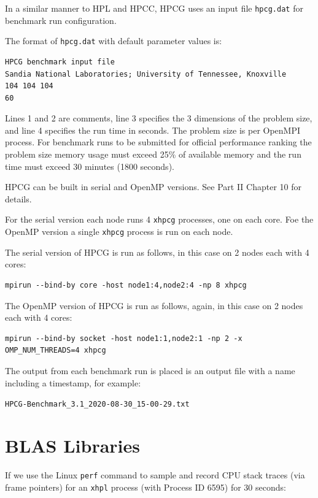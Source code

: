 \documentclass{report}
\begin{document}
In a similar manner to HPL and HPCC, HPCG uses an input file \verb|hpcg.dat| for benchmark run configuration.

The format of \verb|hpcg.dat| with default parameter values is:

\lstset{style=type}
\begin{lstlisting}
HPCG benchmark input file
Sandia National Laboratories; University of Tennessee, Knoxville
104 104 104
60
\end{lstlisting}

Lines 1 and 2 are comments, line 3 specifies the 3 dimensions of the problem size, and line 4 specifies the run time in seconds. The problem size is per OpenMPI process. For benchmark runs to be submitted for official performance ranking the problem size memory usage must exceed 25\% of available memory and the run time must exceed 30 minutes (1800 seconds).

HPCG can be built in serial and OpenMP versions. See Part II Chapter 10 for details.

For the serial version each node runs 4 \verb|xhpcg| processes, one on each core. Foe the OpenMP version a single \verb|xhpcg| process is run on each node.

The serial version of HPCG is run as follows, in this case on 2 nodes each with 4 cores:

\lstset{style=type}
\begin{lstlisting}
mpirun --bind-by core -host node1:4,node2:4 -np 8 xhpcg
\end{lstlisting}

The OpenMP version of HPCG is run as follows, again, in this case on 2 nodes each with 4 cores:

\lstset{style=type}
\begin{lstlisting}
mpirun --bind-by socket -host node1:1,node2:1 -np 2 -x OMP_NUM_THREADS=4 xhpcg
\end{lstlisting}

The output from each benchmark run is placed is an output file with a name including a timestamp, for example:

\verb|HPCG-Benchmark_3.1_2020-08-30_15-00-29.txt|


%
%
\section{BLAS Libraries}

If we use the Linux \verb|perf| command to sample and record CPU stack traces (via frame pointers) for an \verb|xhpl| process (with Process ID 6595) for 30 seconds:
\end{document}
